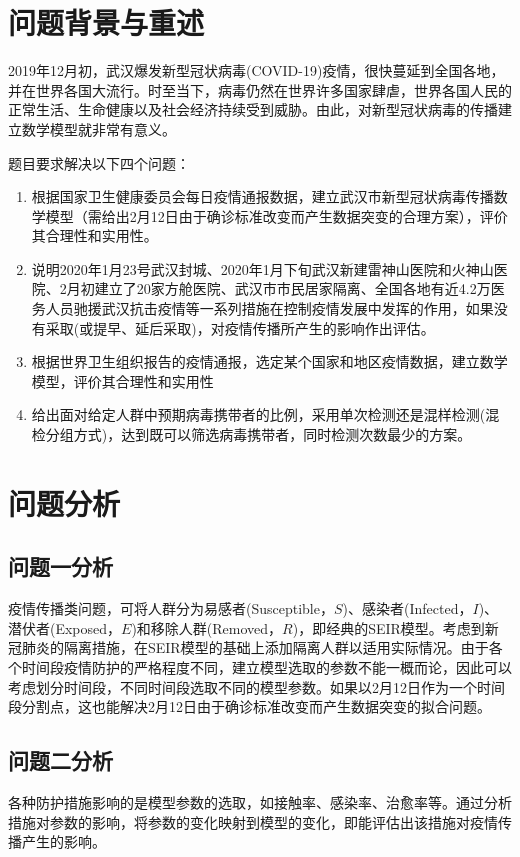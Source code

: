\documentclass[withoutpre]{cumcmthesis} %
\begin{document}

\section{问题背景与重述}
2019年12月初，武汉爆发新型冠状病毒(COVID-19)疫情，很快蔓延到全国各地，并在世界各国大流行。时至当下，病毒仍然在世界许多国家肆虐，世界各国人民的正常生活、生命健康以及社会经济持续受到威胁。由此，对新型冠状病毒的传播建立数学模型就非常有意义。

题目要求解决以下四个问题：
\begin{enumerate}
    \item 根据国家卫生健康委员会每日疫情通报数据，建立武汉市新型冠状病毒传播数学模型（需给出2月12日由于确诊标准改变而产生数据突变的合理方案），评价其合理性和实用性。
    \item 说明2020年1月23号武汉封城、2020年1月下旬武汉新建雷神山医院和火神山医院、2月初建立了20家方舱医院、武汉市市民居家隔离、全国各地有近4.2万医务人员驰援武汉抗击疫情等一系列措施在控制疫情发展中发挥的作用，如果没有采取(或提早、延后采取)，对疫情传播所产生的影响作出评估。
    \item 根据世界卫生组织报告的疫情通报，选定某个国家和地区疫情数据，建立数学模型，评价其合理性和实用性
    \item 给出面对给定人群中预期病毒携带者的比例，采用单次检测还是混样检测(混检分组方式)，达到既可以筛选病毒携带者，同时检测次数最少的方案。
\end{enumerate}

\section{问题分析}
\subsection{问题一分析}
疫情传播类问题，可将人群分为易感者(Susceptible，$S$)、感染者(Infected，$I$)、潜伏者(Exposed，$E$)和移除人群(Removed，$R$)，即经典的SEIR模型。考虑到新冠肺炎的隔离措施，在SEIR模型的基础上添加隔离人群以适用实际情况。由于各个时间段疫情防护的严格程度不同，建立模型选取的参数不能一概而论，因此可以考虑划分时间段，不同时间段选取不同的模型参数。如果以2月12日作为一个时间段分割点，这也能解决2月12日由于确诊标准改变而产生数据突变的拟合问题。

\subsection{问题二分析}
各种防护措施影响的是模型参数的选取，如接触率、感染率、治愈率等。通过分析措施对参数的影响，将参数的变化映射到模型的变化，即能评估出该措施对疫情传播产生的影响。
\end{document}
